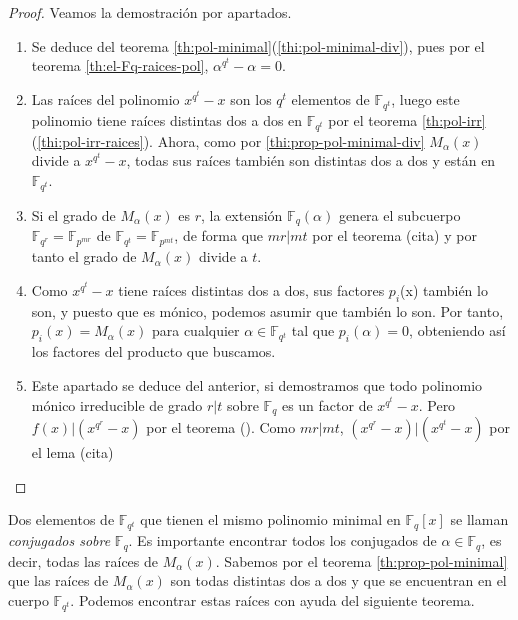 \begin{proof}
  Veamos la demostración por apartados.
  \begin{enumerate}
    \item Se deduce del teorema \ref{th:pol-minimal}(\ref{thi:pol-minimal-div}), pues por el teorema \ref{th:el-Fq-raices-pol}, \(\alpha^{q^t} - \alpha = 0\).
    \item Las raíces del polinomio \(x^{q^t} - x\) son los \(q^t\) elementos de \(\mathbb F_{q^t}\), luego este polinomio tiene raíces distintas dos a dos en \(\mathbb F_{q^t}\) por el teorema \ref{th:pol-irr}(\ref{thi:pol-irr-raices}).
    Ahora, como por \ref{thi:prop-pol-minimal-div} \(M_{\alpha}(x)\) divide a \(x^{q^t} - x\), todas sus raíces también son distintas dos a dos y están en \(\mathbb F_{q^t}\).
    \item Si el grado de \(M_{\alpha}(x)\) es \(r\), la extensión \(\mathbb F_{q}(\alpha)\) genera el subcuerpo \(\mathbb F_{q^r} = \mathbb F_{p^{mr}}\) de \(\mathbb F_{q^t} = \mathbb F_{p^{mt}}\), de forma que \(mr | mt\) por el teorema (cita) y por tanto el grado de \(M_{\alpha}(x)\) divide a \(t\). %
    \item Como \(x^{q^t} - x\) tiene raíces distintas dos a dos, sus factores \(p_i\)(x) también lo son, y puesto que es mónico, podemos asumir que también lo son.
    Por tanto, \(p_{i}(x) = M_{\alpha}(x)\) para cualquier \(\alpha \in \mathbb F_{q^t}\) tal que \(p_i(\alpha) = 0\), obteniendo así los factores del producto que buscamos.
    \item Este apartado se deduce del anterior, si demostramos que todo polinomio mónico irreducible de grado \(r | t\) sobre \(\mathbb F_q\) es un factor de \(x^{q^t} - x\).
    Pero \(f(x) | (x^{q^r} - x)\) por el teorema \label{th:pol-irr}(\label{thi:pol-irr-factor}).
    Como \(mr | mt\), \((x^{q^r} - x) | (x^{q^t} - x)\) por el lema (cita)
  \end{enumerate}
\end{proof}

Dos elementos de \(\mathbb F_{q^t}\) que tienen el mismo polinomio minimal en \(\mathbb F_q[x]\) se llaman \textit{conjugados sobre} \(\mathbb F_q\).
Es importante encontrar todos los conjugados de \(\alpha \in \mathbb F_q\), es decir, todas las raíces de \(M_{\alpha}(x)\).
Sabemos por el teorema \ref{th:prop-pol-minimal} que las raíces de \(M_{\alpha}(x)\) son todas distintas dos a dos y que se encuentran en el cuerpo \(\mathbb F_{q^t}\).
Podemos encontrar estas raíces con ayuda del siguiente teorema.


